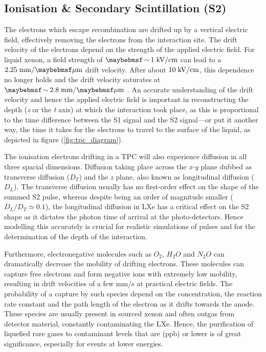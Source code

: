 \subsection{Ionisation \& Secondary Scintillation (S2)}
\label{subsec:s2}

The electrons which escape recombination are drifted up by a vertical electric field, effectively removing the electrons from the interaction site. The drift velocity of the electrons depend on the strength of the applied electric field. For liquid xenon, a field strength of $\sim 1 \; \MathText{kV/cm}$ can lead to a $2.25 \; \MathText{mm/\mu{}m}$ drift velocity. After about $10 \; \text{kV/cm}$, this dependence no longer holds and the drift velocity saturates at $\sim2.8 \; \MathText{mm/\mu{}m}$ \cite{e_drift}. An accurate understanding of the drift velocity and hence the applied electric field is important in reconstructing the depth (\textit{z} or the \textit{t} axis) at which the interaction took place, as this is proportional to the time difference between the S1 signal and the S2 signal---or put it another way, the time it takes for the electrons to travel to the surface of the liquid, as depicted in figure (\ref{fig:tpc_diagram}).

The ionisation electrons drifting in a TPC will also experience diffusion in all three spacial dimensions. Diffusion taking place across the \textit{x-y} plane dubbed as transverse diffusion ($D_{T}$) and the \textit{z} plane, also known as longitudinal diffusion ($D_{L}$). The transverse diffusion usually has no first-order effect on the shape of the summed S2 pulse, whereas despite being an order of magnitude smaller ($D_{L}/D_{T} \simeq 0.1$), the longitudinal diffusion in LXe has a critical effect on the S2 shape as it dictates the photon time of arrival at the photo-detectors. Hence modelling this accurately is crucial for realistic simulations of pulses and for the determination of the depth of the interaction.

Furthermore, electronegative molecules such as $O_{2}$, $H_{2}O$ and $N_{2}O$ can dramatically decrease the mobility of drifting electrons. These molecules can capture free electrons and form negative ions with extremely low mobility, resulting in drift velocities of a few mm/s at practical electric fields. The probability of a capture by such species depend on the concentration, the reaction rate constant and the path length of the electron as it drifts towards the anode. These species are usually present in sourced xenon and often outgas from detector material, constantly contaminating the LXe. Hence, the purification of liquefied rare gases to contaminant levels that are (ppb) or lower is of great significance, especially for events at lower energies.

